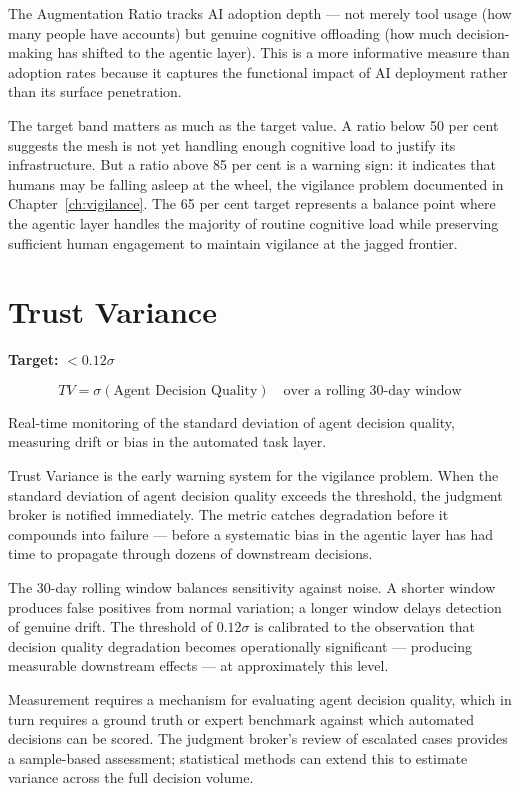 The Augmentation Ratio tracks AI adoption depth --- not merely tool usage (how many people have accounts) but genuine cognitive offloading (how much decision-making has shifted to the agentic layer). This is a more informative measure than adoption rates because it captures the functional impact of AI deployment rather than its surface penetration.

The target band matters as much as the target value. A ratio below 50 per cent suggests the mesh is not yet handling enough cognitive load to justify its infrastructure. But a ratio above 85 per cent is a warning sign: it indicates that humans may be falling asleep at the wheel, the vigilance problem documented in Chapter~\ref{ch:vigilance}. The 65 per cent target represents a balance point where the agentic layer handles the majority of routine cognitive load while preserving sufficient human engagement to maintain vigilance at the jagged frontier.

\section{Trust Variance}

\begin{definitionbox}[title={Trust Variance (TV)}]
\textbf{Target:} $< 0.12\sigma$

\[
TV = \sigma \left( \text{Agent Decision Quality} \right) \quad \text{over a rolling 30-day window}
\]

Real-time monitoring of the standard deviation of agent decision quality, measuring drift or bias in the automated task layer.
\end{definitionbox}

Trust Variance is the early warning system for the vigilance problem. When the standard deviation of agent decision quality exceeds the threshold, the judgment broker is notified immediately. The metric catches degradation before it compounds into failure --- before a systematic bias in the agentic layer has had time to propagate through dozens of downstream decisions.

The 30-day rolling window balances sensitivity against noise. A shorter window produces false positives from normal variation; a longer window delays detection of genuine drift. The threshold of $0.12\sigma$ is calibrated to the observation that decision quality degradation becomes operationally significant --- producing measurable downstream effects --- at approximately this level.

Measurement requires a mechanism for evaluating agent decision quality, which in turn requires a ground truth or expert benchmark against which automated decisions can be scored. The judgment broker's review of escalated cases provides a sample-based assessment; statistical methods can extend this to estimate variance across the full decision volume.

